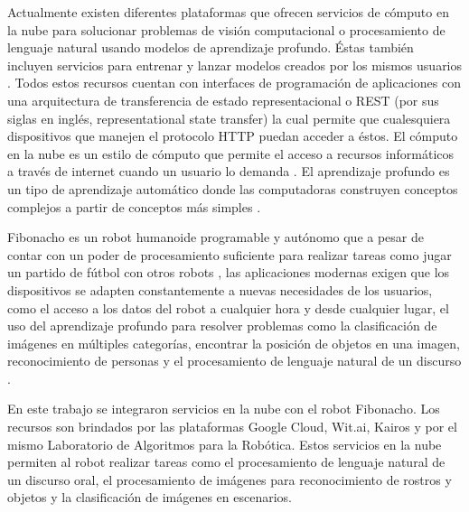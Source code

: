 


Actualmente existen diferentes plataformas que 
ofrecen servicios
de cómputo en la nube para solucionar problemas de 
visión computacional \cite{googlevision2018} o
procesamiento de lenguaje natural \cite{witaidocs2018} usando modelos
de aprendizaje profundo. Éstas también incluyen servicios 
para entrenar y lanzar
modelos creados por los mismos usuarios \cite{tensorflowgooglecloud2018}.
Todos estos recursos cuentan con interfaces de programación de aplicaciones
con una arquitectura de transferencia de estado representacional o REST (por sus siglas en inglés, representational state transfer) la cual 
permite que cualesquiera dispositivos que manejen el protocolo HTTP
puedan acceder a éstos.
El cómputo en la nube es un estilo de cómputo que 
permite el acceso a 
recursos informáticos a través de internet cuando un
usuario lo demanda \cite{borkofurhtarmandoescalante2010}. El aprendizaje profundo es un 
tipo
de aprendizaje automático donde las computadoras 
construyen
conceptos complejos a partir de conceptos más 
simples \cite{iangoodfellowyoshuabengioaaroncourville2017}.


Fibonacho es un robot humanoide programable y autónomo
que a pesar de contar con
un poder de procesamiento suficiente para realizar 
tareas como
jugar un partido de fútbol con otros robots \cite{splinfo2018},
las aplicaciones modernas
exigen que los dispositivos se adapten constantemente a nuevas necesidades
de los usuarios, como el acceso a los datos
del robot a cualquier hora y desde cualquier lugar, el uso del aprendizaje profundo para resolver problemas como la 
clasificación de imágenes en múltiples categorías, encontrar
la posición de objetos en una imagen, reconocimiento
de personas y el 
procesamiento de lenguaje natural de un discurso \cite{benkehoesachinpatilpieterabbeelkengoldberg2014}.


En este trabajo se integraron servicios en la nube
con el robot Fibonacho.
Los recursos son brindados por las plataformas
Google Cloud, Wit.ai, Kairos y por
el mismo Laboratorio de Algoritmos para la
Robótica.
Estos servicios en la nube permiten al robot
realizar tareas como el procesamiento de lenguaje
natural de un discurso oral, el procesamiento 
de imágenes para reconocimiento de rostros
y objetos y la clasificación de
imágenes en escenarios.